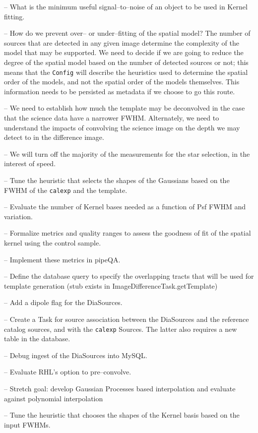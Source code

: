 \documentclass[12pt]{article}
\begin{document}
-- What is the minimum useful signal--to--noise of an object to be
used in Kernel fitting.

-- How do we prevent over-- or under--fitting of the spatial model?
The number of sources that are detected in any given image determine
the complexity of the model that may be supported.  We need to decide
if we are going to reduce the degree of the spatial model based on the
number of detected sources or not; this means that the {\tt Config}
will describe the heuristics used to determine the spatial order of
the models, and not the spatial order of the models themselves.  This
information needs to be persisted as metadata if we choose to go this
route.

-- We need to establish how much the template may be deconvolved in
the case that the science data have a narrower FWHM.  Alternately, we
need to understand the impacts of convolving the science image on the
depth we may detect to in the difference image.

-- We will turn off the majority of the measurements for the star
selection, in the interest of speed.

-- Tune the heuristic that selects the shapes of the Gaussians based
on the FWHM of the {\tt calexp} and the template.

-- Evaluate the number of Kernel bases needed as a function of Psf
FWHM and variation.

-- Formalize metrics and quality ranges to assess the goodness of fit
of the spatial kernel using the control sample.

-- Implement these metrics in pipeQA.

-- Define the database query to specify the overlapping tracts that
will be used for template generation (stub exists in
ImageDifferenceTask.getTemplate)

-- Add a dipole flag for the DiaSources.

-- Create a Task for source association between the DiaSources and the
reference catalog sources, and with the {\tt calexp} Sources.  The
latter also requires a new table in the database.

-- Debug ingest of the DiaSources into MySQL.

-- Evaluate RHL's option to pre--convolve.

-- Stretch goal: develop Gaussian Processes based interpolation and
evaluate against polynomial interpolation

-- Tune the heuristic that chooses the shapes of the Kernel basis
based on the input FWHMs.
\end{document}

